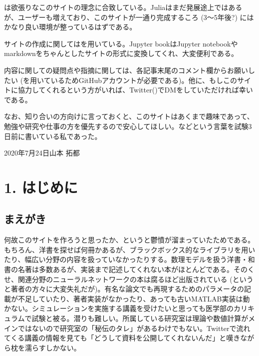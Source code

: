 \documentclass[letterpaper,10pt,english]{sphinxmanual}
\begin{document}
は欲張りなこのサイトの理念に合致している。Juliaはまだ発展途上ではあるが、ユーザーも増えており、このサイトが一通り完成するころ (3～5年後?) にはかなり良い環境が整っているはずである。

サイトの作成に関してはを用いている。Jupyter bookはJupyter notebookやmarkdownをちゃんとしたサイトの形式に変換してくれ、大変便利である。

内容に関しての疑問点や指摘に関しては、各記事末尾のコメント欄からお願いしたい (を用いているためGitHubアカウントが必要である)。他に、もしこのサイトに協力してくれるという方がいれば、Twitter()でDMをしていただければ幸いである。

なお、知り合いの方向けに言っておくと、このサイトはあくまで趣味であって、勉強や研究や仕事の方を優先するので安心してほしい。などという言葉を試験3日前に書いている私であった。

2020年7月24日山本 拓都


\section{1. はじめに}
\label{\detokenize{1_intro:id1}}\label{\detokenize{1_intro::doc}}

\subsection{まえがき}
\label{\detokenize{preface:id1}}\label{\detokenize{preface::doc}}
何故このサイトを作ろうと思ったか、というと鬱憤が溜まっていたためである。 もちろん、洋書を探せば何冊かあるが、ブラックボックス的なライブラリを用いたり、幅広い分野の内容を扱っていなかったりする。数理モデルを扱う洋書・和書の名著は多数あるが、実装まで記述してくれない本がほとんどである。そのくせ、関連分野のニューラルネットワークの本は腐るほど出版されている (というと著者の方々に大変失礼だが)。有名な論文でも再現するためのパラメータの記載が不足していたり、著者実装がなかったり、あっても古いMATLAB実装は動かない。シミュレーションを実施する講義を受けたいと思っても医学部のカリキュラムで試験と被る。潜りも難しい。所属している研究室は理論や数値計算がメインではないので研究室の「秘伝のタレ」があるわけでもない。Twitterで流れてくる講義の情報を見ても「どうして資料を公開してくれないんだ」と嘆きながら枕を濡らすしかない。
\end{document}

